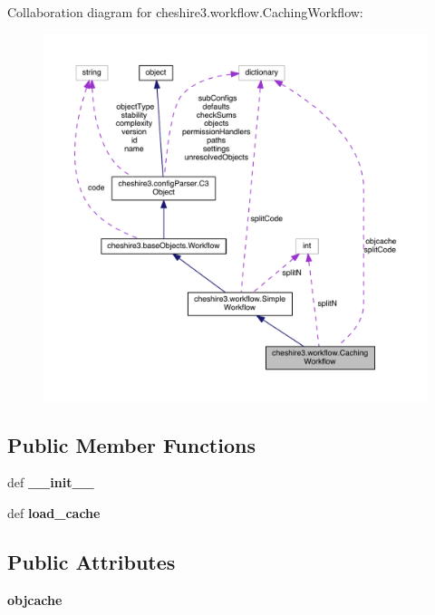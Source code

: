 Collaboration diagram for cheshire3.\-workflow.\-Caching\-Workflow\-:
\nopagebreak
\begin{figure}[H]
\begin{center}
\leavevmode
\includegraphics[width=350pt]{classcheshire3_1_1workflow_1_1_caching_workflow__coll__graph}
\end{center}
\end{figure}
\subsection*{Public Member Functions}
\begin{DoxyCompactItemize}
\item 
\hypertarget{classcheshire3_1_1workflow_1_1_caching_workflow_add96508095d1bdaf6007d3e95c12612b}{def {\bfseries \-\_\-\-\_\-init\-\_\-\-\_\-}}\label{classcheshire3_1_1workflow_1_1_caching_workflow_add96508095d1bdaf6007d3e95c12612b}

\item 
\hypertarget{classcheshire3_1_1workflow_1_1_caching_workflow_a45d54f7237abecf5648b0cfd0d4dedfb}{def {\bfseries load\-\_\-cache}}\label{classcheshire3_1_1workflow_1_1_caching_workflow_a45d54f7237abecf5648b0cfd0d4dedfb}

\end{DoxyCompactItemize}
\subsection*{Public Attributes}
\begin{DoxyCompactItemize}
\item 
\hypertarget{classcheshire3_1_1workflow_1_1_caching_workflow_ac396ed467287e6a37c96744ff8ddf4de}{{\bfseries objcache}}\label{classcheshire3_1_1workflow_1_1_caching_workflow_ac396ed467287e6a37c96744ff8ddf4de}

\end{DoxyCompactItemize}
